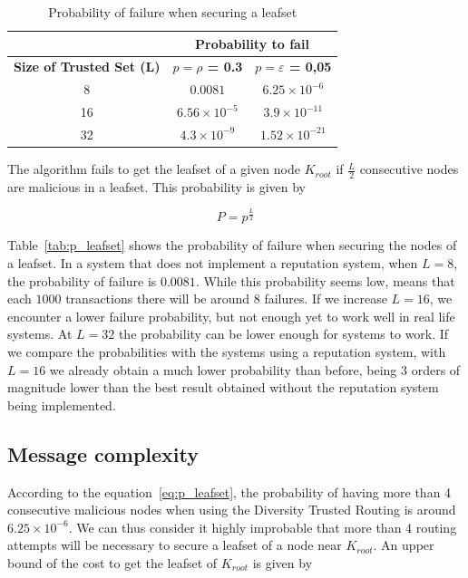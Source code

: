   \begin{table}
    \centering
    \footnotesize
    \begin{tabular}{|c|c|c|}
      \cline{2-3}
      \multicolumn{1}{c|}{}&  \multicolumn{2}{c|}{\textbf{Probability to fail}} \\ \cline{2-3}
      \hline
      \textbf{Size of Trusted Set (L)} & \textbf{$p = \rho$ = 0.3} & \textbf{$p = \varepsilon$ = 0,05} \\
      \hline \hline
      8 &  $0.0081$              & $6.25 \times 10^{-6}$  \\
      \hline
      16 & $6.56 \times 10^{-5}$ & $ 3.9 \times 10^{-11}$ \\
      \hline
      32 & $4.3 \times 10^{-9}$  & $ 1.52 \times 10^{-21} $  \\
      \hline
    \end{tabular}
    \caption{Probability of failure when securing a leafset}
    \label{tab:p_leafset}
  \end{table}

  The algorithm fails to get the leafset of a given node
  $K_{root}$ if $\frac{L}{2}$ consecutive nodes are malicious in a leafset. This
  probability is given by
  
  \begin{equation} \label{eq:p_leafset}
    P= p^{\frac{L}{2}}
  \end{equation}

  
  Table~\eqref{tab:p_leafset} shows the probability of failure when securing the
  nodes of a leafset. In a system that does not implement a reputation system,
when $L=8$, the probability of failure is $0.0081$. While this probability seems
low, means that each $1000$ transactions there will be around $8$ failures. If
we increase $L=16$, we encounter a lower failure probability, but not enough
yet to work well in real life systems. At $L=32$ the probability can be lower
enough for systems to work. If we compare the probabilities with the systems
using a reputation system, with $L=16$ we already obtain a much lower
probability than before, being 3 orders of magnitude lower than the best result
obtained without the reputation system being implemented.
  
  
  \subsection{Message complexity}

      According to the equation~\eqref{eq:p_leafset}, the probability of having
more than 4 consecutive malicious nodes when using the Diversity Trusted
Routing is around $6.25 \times 10^{-6}$. We can thus consider it highly
improbable that more than 4 routing attempts will be necessary  to secure a
leafset of a node near $K_{root}$. An upper bound of the cost to get the
leafset of $K_{root}$ is given by
      
